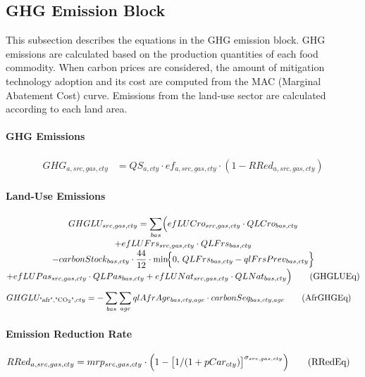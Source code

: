 \subsection{GHG Emission Block}

This subsection describes the equations in the GHG emission block.  
GHG emissions are calculated based on the production quantities of each food commodity.  
When carbon prices are considered, the amount of mitigation technology adoption and its cost are computed from the MAC (Marginal Abatement Cost) curve.  
Emissions from the land-use sector are calculated according to each land area.

\paragraph{GHG Emissions}
\begin{align}
  GHG_{a,src,gas,cty}
  &= QS_{a,cty}
     \cdot
     ef_{a,src,gas,cty}
     \cdot
     (1 - RRed_{a,src,gas,cty})
  \tag{GHGAgEq}\label{eq:GHGAgEq}
\end{align}

\paragraph{Land-Use Emissions}
\begin{multline}
  GHGLU_{src,gas,cty}
  =
  \sum_{bas}\Bigl(
    efLUCro_{src,gas,cty}\cdot QLCro_{bas,cty}
    \\[-0.3em]
    + efLUFrs_{src,gas,cty}\cdot QLFrs_{bas,cty}
    \\[-0.3em]
    - carbonStock_{bas,cty}\cdot\frac{44}{12}
      \cdot \min\!\Bigl\{
        0,\,
        QLFrs_{bas,cty}-qlFrsPrev_{bas,cty}
      \Bigr\}
    \\[-0.3em]
    + efLUPas_{src,gas,cty}\cdot QLPas_{bas,cty}
    + efLUNat_{src,gas,cty}\cdot QLNat_{bas,cty}
  \Bigr)
  \tag{GHGLUEq}\label{eq:GHGLUEq}
\end{multline}
\begin{align}
  GHGLU_{\text{"afr"},\text{"CO\textsubscript{2}"},cty}
  &=
  - \sum_{bas}\sum_{age}
      qlAfrAge_{bas,cty,age}
      \cdot carbonSeq_{bas,cty,age}
  \tag{AfrGHGEq}\label{eq:AfrGHGEq}
\end{align}

\paragraph{Emission Reduction Rate}
\begin{align}
  RRed_{a,src,gas,cty}
  &= mrp_{src,gas,cty}
     \cdot
     \Bigl(
       1 -
       \bigl[
         1 / (1 + pCar_{cty})
       \bigr]^{\sigma_{src,gas,cty}}
     \Bigr)
  \tag{RRedEq}\label{eq:RRedEq}
\end{align}

